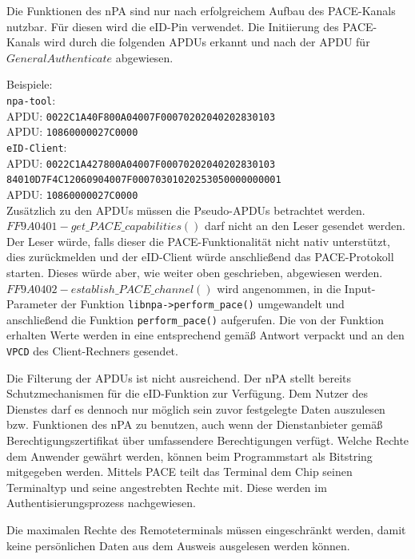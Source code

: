\documentclass[toc=flat,fontsize=11pt,a4paper,titlepage,headsepline,numbers=noenddot, bibliography=totoc]{scrartcl}
\begin{document}
Die Funktionen des nPA sind nur nach erfolgreichem Aufbau des PACE-Kanals nutzbar. Für diesen wird die eID-Pin verwendet.
Die Initiierung des PACE-Kanals wird durch die folgenden APDUs erkannt und nach der APDU für $General Authenticate$ abgewiesen.

Beispiele:\\
\verb+npa-tool+:\\
APDU: \texttt{0022C1A40F800A04007F00070202040202830103}\\
APDU: \texttt{10860000027C0000}\\
\verb+eID-Client+:\\
APDU: \texttt{0022C1A427800A04007F00070202040202830103}\\
		   \texttt{84010D7F4C12060904007F00070301020253050000000001}\\ 
APDU: \texttt{10860000027C0000}\\

Zusätzlich zu den APDUs müssen die Pseudo-APDUs betrachtet werden. 
$FF9A0401 - get\_PACE\_capabilities()$ darf nicht an den Leser gesendet werden. Der Leser würde, falls dieser die PACE-Funktionalität nicht nativ unterstützt, 
dies zurückmelden und der eID-Client würde anschließend das PACE-Protokoll starten. Dieses würde aber, wie weiter oben geschrieben, abgewiesen werden.\\
$FF9A0402 - establish\_PACE\_channel()$ wird angenommen, in die Input-Parameter der Funktion  \verb+libnpa->perform_pace()+ umgewandelt und 
anschließend die Funktion \verb+perform_pace()+ aufgerufen. Die von der Funktion erhalten Werte werden in eine entsprechend gemäß \cite{TR3119} Antwort 
verpackt und an den \verb+VPCD+ des Client-Rechners gesendet.

Die Filterung der APDUs ist nicht ausreichend. Der nPA stellt bereits Schutzmechanismen für die eID-Funktion zur Verfügung.
Dem Nutzer des Dienstes darf es dennoch nur möglich sein zuvor festgelegte Daten auszulesen bzw. Funktionen des nPA zu benutzen, 
auch wenn der Dienstanbieter gemäß Berechtigungszertifikat über umfassendere Berechtigungen verfügt.
Welche Rechte dem Anwender gewährt werden, können beim Programmstart als Bitstring mitgegeben werden. 
Mittels PACE teilt das Terminal dem Chip seinen Terminaltyp und seine angestrebten Rechte mit. Diese werden im Authentisierungsprozess nachgewiesen.

Die maximalen Rechte des Remoteterminals müssen eingeschränkt werden, damit keine persönlichen Daten aus dem Ausweis ausgelesen werden können.  
\end{document}
